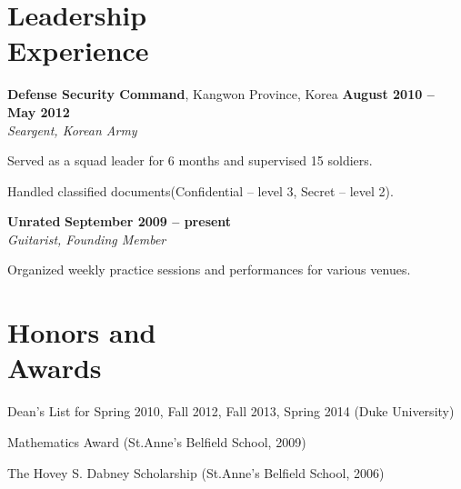 \documentclass[11pt,margin,line]{cv}
\begin{document}
\begin{resume}
    \section{\mysidestyle Leadership\\Experience}
    \textbf{Defense Security Command}, Kangwon Province, Korea \hfill \textbf{August 2010 -- May 2012}\vspace{1mm}\\\vspace{0mm}%
    \textsl{Seargent, Korean Army}
    \vspace{-2mm}\\\vspace{-1mm}%
    \begin{list3}
        \item Served as a squad leader for 6 months and supervised 15 soldiers.
        \item Handled classified documents(Confidential -- level 3, Secret -- level 2).
    \end{list3}
    \textbf{Unrated}  \hfill \textbf{September 2009 -- present}\vspace{1mm}\\\vspace{0mm}%
    \textsl{Guitarist, Founding Member}
    \vspace{-2mm}\\\vspace{-1mm}%
    \begin{list3}
        \item Organized weekly practice sessions and performances for various venues.
    \end{list3}
    \section{\mysidestyle Honors and\\Awards}
    \begin{list3}
        \item Dean's List for Spring 2010, Fall 2012, Fall 2013, Spring 2014 (Duke University)
        \item Mathematics Award (St.Anne's Belfield School, 2009)
        \item The Hovey S. Dabney Scholarship (St.Anne's Belfield School, 2006)
    \end{list3}

\end{resume}
\end{document}

